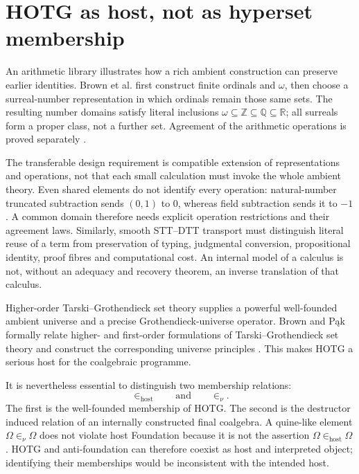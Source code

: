 \documentclass[11pt]{article}
\theoremstyle{definition}
\theoremstyle{remark}
\begin{document}
\section{HOTG as host, not as hyperset membership}

An arithmetic library illustrates how a rich ambient construction can preserve
earlier identities. Brown et al. first construct finite ordinals and $\omega$,
then choose a surreal-number representation in which ordinals remain those
same sets. The resulting number domains satisfy literal inclusions
$\omega\subseteq\mathbb Z\subseteq\mathbb Q\subseteq\mathbb R$; all surreals
form a proper class, not a further set. Agreement of the arithmetic operations
is proved separately \cite{BrownKaliszykSudaUrbanHammering}.

The transferable design requirement is compatible extension of representations
and operations, not that each small calculation must invoke the whole ambient
theory. Even shared elements do not identify every operation: natural-number
truncated subtraction sends $(0,1)$ to $0$, whereas field subtraction sends it
to $-1$. A common domain therefore needs explicit operation restrictions and
their agreement laws. Similarly, smooth STT--DTT transport must distinguish
literal reuse of a term from preservation of typing, judgmental conversion,
propositional identity, proof fibres and computational cost. An internal model
of a calculus is not, without an adequacy and recovery theorem, an inverse
translation of that calculus.

Higher-order Tarski--Grothendieck set theory supplies a powerful well-founded
ambient universe and a precise Grothendieck-universe operator.  Brown and P\k{a}k
formally relate higher- and first-order formulations of Tarski--Grothendieck set
theory and construct the corresponding universe principles
\cite{BrownPakTwoSetTheories}.  This makes HOTG a serious host for the
coalgebraic programme.

It is nevertheless essential to distinguish two membership relations:
\[
  \in_{\mathrm{host}}
  \qquad\text{and}\qquad
  \in_{\nu}.
\]
The first is the well-founded membership of HOTG.  The second is the destructor
induced relation of an internally constructed final coalgebra.  A quine-like
element $\Omega\in_{\nu}\Omega$ does not violate host Foundation because it is not
the assertion $\Omega\in_{\mathrm{host}}\Omega$.  HOTG and anti-foundation can
therefore coexist as host and interpreted object; identifying their memberships
would be inconsistent with the intended host.
\end{document}
